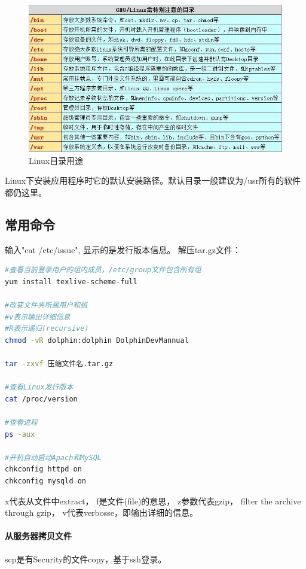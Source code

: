 \documentclass{book}
\begin{document}
\begin{figure}[htbp]
	\centering
	\includegraphics[scale=0.6]{LinuxDirectoryExplain.jpg}
	\caption{Linux目录用途}
	\label{code:LinuxDirectoryExplain}
\end{figure}


Linux下安装应用程序时它的默认安装路径。默认目录一般建议为/usr所有的软件都仍这里。

\subsection{常用命令}

输入"cat /etc/issue", 显示的是发行版本信息。
解压tar.gz文件：

\begin{lstlisting}[language=Bash]
#查看当前登录用户的组内成员，/etc/group文件包含所有组
yum install texlive-scheme-full

#改变文件夹所属用户和组
#v表示输出详细信息
#R表示递归(recursive)
chmod -vR dolphin:dolphin DolphinDevMannual

tar -zxvf 压缩文件名.tar.gz

#查看Linux发行版本
cat /proc/version

#查看进程
ps -aux

#开机自动启动Apach和MySQL
chkconfig httpd on
chkconfig mysqld on
\end{lstlisting}

x代表从文件中extract，
f是文件(file)的意思，
z参数代表gzip，
filter the archive through gzip，
v代表verbosse，即输出详细的信息。

\paragraph{从服务器拷贝文件}

scp是有Security的文件copy，基于ssh登录。 
\end{document}
